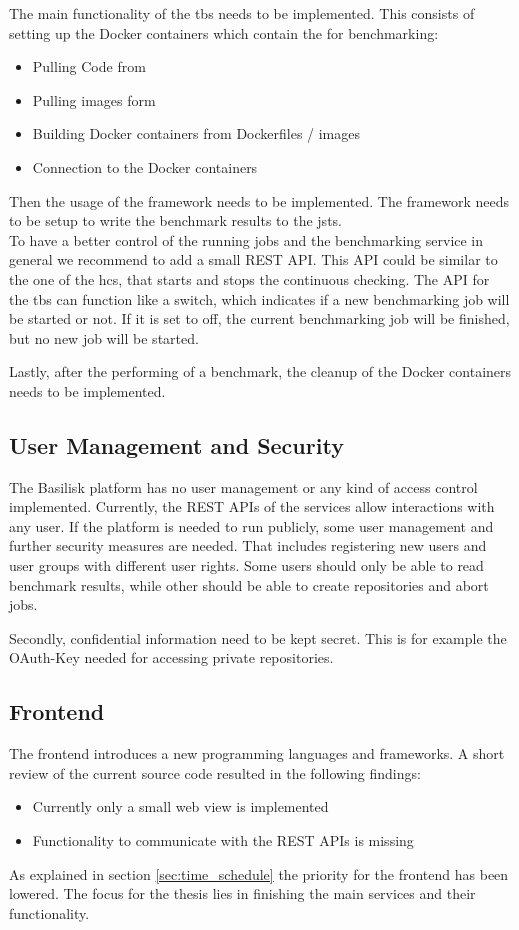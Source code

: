The main functionality of the \ac{tbs} needs to be implemented.
This consists of setting up the Docker containers which contain the \tsp{} for benchmarking:

\begin{itemize}
	\item Pulling Code from \gh{}
	\item Pulling images form \dockh{}
	
	\item Building Docker containers from Dockerfiles / images
	
	\item Connection to the Docker containers
\end{itemize}

Then the usage of the \iguana{} framework needs to be implemented.
The framework needs to be setup to write the benchmark results to the \acl{jsts}.
\\

To have a better control of the running jobs and the benchmarking service in general we recommend to add a small REST API.
This API could be similar to the one of the \ac{hcs}, that starts and stops the continuous checking.
The API for the \ac{tbs} can function like a switch, which indicates if a new benchmarking job will be started or not.
If it is set to off, the current benchmarking job will be finished, but no new job will be started.

Lastly, after the performing of a benchmark, the cleanup of the Docker containers needs to be implemented.

\subsection{User Management and Security}
\label{sec:review_user_management}
The Basilisk platform has no user management or any kind of access control implemented.
Currently, the REST APIs of the services allow interactions with any user.
If the platform is needed to run publicly, some user management and further security measures are needed.
That includes registering new users and user groups with different user rights.
Some users should only be able to read benchmark results, while other should be able to create repositories and abort jobs.

Secondly, confidential information need to be kept secret.
This is for example the OAuth-Key needed for accessing private \gh{} repositories.


\subsection{Frontend}
\label{sec:review_frontend}
The frontend introduces a new programming languages and frameworks.
A short review of the current source code resulted in the following findings:
\begin{itemize}
	\item Currently only a small web view is implemented
	\item Functionality to communicate with the REST APIs is missing
\end{itemize}


As explained in section \ref{sec:time_schedule} the priority for the frontend has been lowered.
The focus for the thesis lies in finishing the main services and their functionality.

